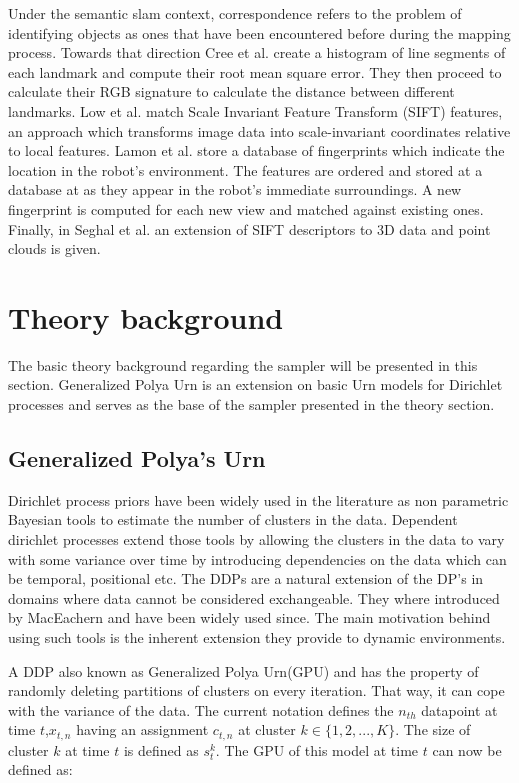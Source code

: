\documentclass[]{article}
\begin{document}
Under the semantic slam context, correspondence refers to the problem of identifying objects as ones that have been encountered before during the mapping process. Towards that direction Cree et al.\cite{corresp:first} create a histogram of line segments of each landmark and compute their root mean square error. They then proceed to calculate their RGB signature to calculate the distance between different landmarks. Low et al.\cite{corres:sec} match Scale Invariant Feature Transform (SIFT) features, an approach which transforms image data into scale-invariant coordinates relative to local features. Lamon et al.\cite{corres:three} store a database of fingerprints which indicate the location in the robot's environment. The features are ordered and stored at a database at as they appear in the robot's immediate surroundings. A new fingerprint is computed for each new view and matched against existing ones. Finally, in Seghal et al.\cite{corres:four} an extension of SIFT descriptors to 3D data and point clouds is given.

\section{Theory background}
\label{sec:theory}

The basic theory background regarding the sampler will be presented in this section. Generalized Polya Urn is an extension on basic Urn\cite{caron} models for Dirichlet processes and serves as the base of the sampler presented in the theory section.

\subsection{Generalized Polya's Urn}

Dirichlet process priors have been widely used in the literature as non parametric Bayesian tools to estimate the number of clusters in the data\cite{antoniak}. Dependent dirichlet processes extend those tools by allowing the clusters in the data to vary with some variance over time by introducing dependencies on the data which can be temporal, positional etc. The DDPs are a natural extension of the DP's in domains where data cannot be considered exchangeable. They where introduced by MacEachern\cite{theory:ddp} and have been widely used since. The main motivation behind using such tools is the inherent extension they provide to dynamic environments.

A DDP also known as Generalized Polya Urn(GPU)\cite{caron} and has the property of randomly deleting partitions of clusters on every iteration. That way, it can cope with the variance of the data. The current notation defines the $n_{th}$ datapoint at time $t$,$x_{t,n}$ having an assignment $c_{t,n}$ at cluster $k \in \{1,2,..., K\} $. The size of cluster $k$ at time $t$ is defined as $s_t^k$. The GPU of this model at time $t$ can now be defined as:
\end{document}

